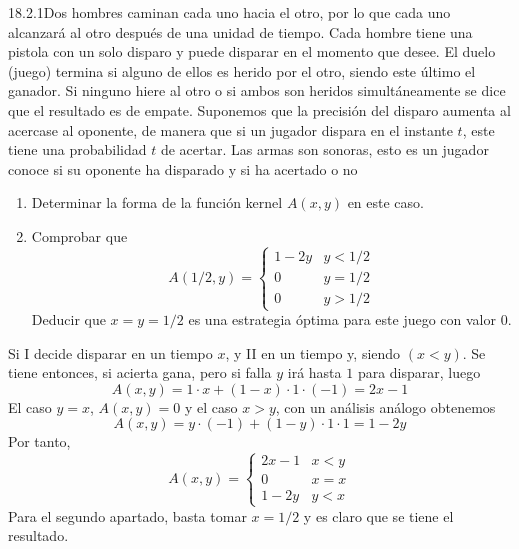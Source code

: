\documentclass[twoside]{article}
\begin{document}
\begin{ejercicio}{18.2.1}Dos hombres caminan cada uno hacia el otro, por lo que cada uno alcanzará al otro después de una unidad de tiempo. Cada hombre tiene una pistola con un solo disparo y puede disparar en el momento que desee. El duelo (juego) termina si alguno de ellos es herido por el otro, siendo este último el ganador. Si ninguno hiere al otro o si ambos son heridos simultáneamente se dice que el resultado es de empate. Suponemos que la precisión del disparo aumenta al acercase al oponente, de manera que si un jugador dispara en el instante $t$, este tiene una probabilidad $t$ de acertar. Las armas son sonoras, esto es un jugador conoce si su oponente ha disparado y si ha acertado o no

\begin{enumerate}
\item Determinar la forma de la función kernel $A(x,y)$ en este caso.
\item Comprobar que 
$$
A(1/2,y)= \begin{cases}
1-2y & y<1/2\\
0 & y=1/2\\
0 & y>1/2
\end{cases}
$$
Deducir que $x = y = 1/2$ es una estrategia óptima para este juego con valor $0$.
\end{enumerate}
\end{ejercicio}
\begin{solucion}
Si I decide disparar en un tiempo $x$, y II en un tiempo y, siendo $(x < y)$. Se tiene entonces, si acierta gana, pero si falla $y$ irá hasta $1$ para disparar, luego
$$
A(x,y) =1\cdot x + (1-x)\cdot 1 \cdot (-1) = 2x-1
$$
El caso $y=x$, $A(x,y)=0$ y el caso $x>y$, con un análisis análogo obtenemos
$$
A(x,y) = y\cdot (-1) + (1-y)\cdot 1 \cdot 1 = 1-2y
$$
Por tanto,
$$
A(x,y)= \begin{cases}
2x-1 & x<y\\
0 & x=x\\
1-2y & y<x
\end{cases}
$$
Para el segundo apartado, basta tomar $x=1/2$ y es claro que se tiene el resultado.
\end{solucion}
\end{document}
